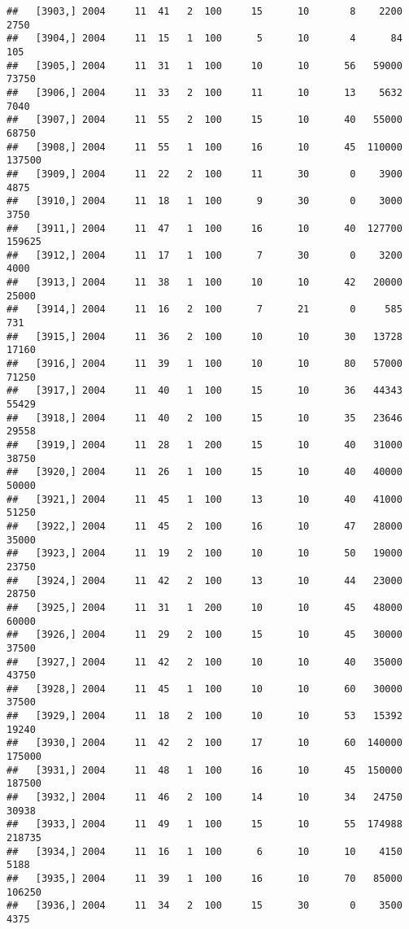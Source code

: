 \documentclass{article}\usepackage[]{graphicx}\usepackage[]{color}
\makeatletter
\newenvironment{kframe}{%
 \def\at@end@of@kframe{}%
 \ifinner\ifhmode%
  \def\at@end@of@kframe{\end{minipage}}%
  \begin{minipage}{\columnwidth}%
 \fi\fi%
 \def\FrameCommand##1{\hskip\@totalleftmargin \hskip-\fboxsep
 \colorbox{shadecolor}{##1}\hskip-\fboxsep
     \hskip-\linewidth \hskip-\@totalleftmargin \hskip\columnwidth}%
 \MakeFramed {\advance\hsize-\width
   \@totalleftmargin\z@ \linewidth\hsize
   \@setminipage}}%
 {\par\unskip\endMakeFramed%
 \at@end@of@kframe}
\newenvironment{knitrout}{}{} %
\makeatother
\begin{document}
\begin{knitrout}
\begin{kframe}
\begin{verbatim}
##   [3903,] 2004     11  41   2  100     15      10       8    2200    2750
##   [3904,] 2004     11  15   1  100      5      10       4      84     105
##   [3905,] 2004     11  31   1  100     10      10      56   59000   73750
##   [3906,] 2004     11  33   2  100     11      10      13    5632    7040
##   [3907,] 2004     11  55   2  100     15      10      40   55000   68750
##   [3908,] 2004     11  55   1  100     16      10      45  110000  137500
##   [3909,] 2004     11  22   2  100     11      30       0    3900    4875
##   [3910,] 2004     11  18   1  100      9      30       0    3000    3750
##   [3911,] 2004     11  47   1  100     16      10      40  127700  159625
##   [3912,] 2004     11  17   1  100      7      30       0    3200    4000
##   [3913,] 2004     11  38   1  100     10      10      42   20000   25000
##   [3914,] 2004     11  16   2  100      7      21       0     585     731
##   [3915,] 2004     11  36   2  100     10      10      30   13728   17160
##   [3916,] 2004     11  39   1  100     10      10      80   57000   71250
##   [3917,] 2004     11  40   1  100     15      10      36   44343   55429
##   [3918,] 2004     11  40   2  100     15      10      35   23646   29558
##   [3919,] 2004     11  28   1  200     15      10      40   31000   38750
##   [3920,] 2004     11  26   1  100     15      10      40   40000   50000
##   [3921,] 2004     11  45   1  100     13      10      40   41000   51250
##   [3922,] 2004     11  45   2  100     16      10      47   28000   35000
##   [3923,] 2004     11  19   2  100     10      10      50   19000   23750
##   [3924,] 2004     11  42   2  100     13      10      44   23000   28750
##   [3925,] 2004     11  31   1  200     10      10      45   48000   60000
##   [3926,] 2004     11  29   2  100     15      10      45   30000   37500
##   [3927,] 2004     11  42   2  100     10      10      40   35000   43750
##   [3928,] 2004     11  45   1  100     10      10      60   30000   37500
##   [3929,] 2004     11  18   2  100     10      10      53   15392   19240
##   [3930,] 2004     11  42   2  100     17      10      60  140000  175000
##   [3931,] 2004     11  48   1  100     16      10      45  150000  187500
##   [3932,] 2004     11  46   2  100     14      10      34   24750   30938
##   [3933,] 2004     11  49   1  100     15      10      55  174988  218735
##   [3934,] 2004     11  16   1  100      6      10      10    4150    5188
##   [3935,] 2004     11  39   1  100     16      10      70   85000  106250
##   [3936,] 2004     11  34   2  100     15      30       0    3500    4375

\end{verbatim}
\end{kframe}
\end{knitrout}
\end{document}
